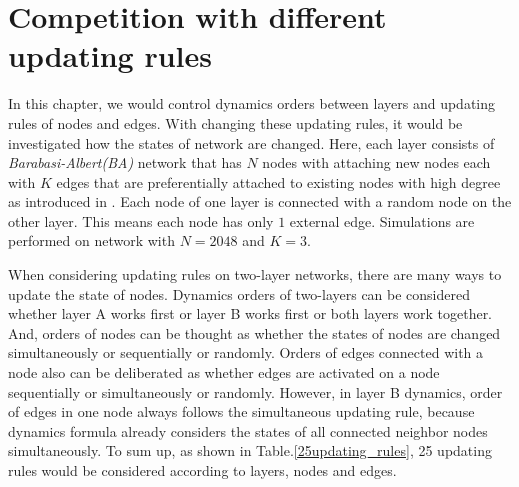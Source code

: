 
\chapter{Competition with different updating rules}
\label{chap4}
In this chapter, we would control dynamics orders between layers and updating rules of nodes and edges. With changing these updating rules, it would be investigated how the states of network are changed. Here, each layer consists of \textit{Barabasi-Albert(BA)} network that has $N$ nodes with attaching new nodes each with $K$ edges that are preferentially attached to existing nodes with high degree as introduced in \parencite{barabasi1999}. Each node of one layer is connected with a random node on the other layer. This means each node has only $1$ external edge. Simulations are performed on network with $N=2048$ and $K=3$.

When considering updating rules on two-layer networks, there are many ways to update the state of nodes. Dynamics orders of two-layers can be considered whether layer A works first or layer B works first or both layers work together. And, orders of nodes can be thought as whether the states of nodes are changed simultaneously or sequentially or randomly. Orders of edges connected with a node also can be deliberated as whether edges are activated on a node sequentially or simultaneously or randomly. However, in layer B dynamics, order of edges in one node always follows the simultaneous updating rule, because dynamics formula already considers the states of all connected neighbor nodes simultaneously. To sum up, as shown in Table.\ref{25updating_rules}, 25 updating rules would be considered according to layers, nodes and edges.

